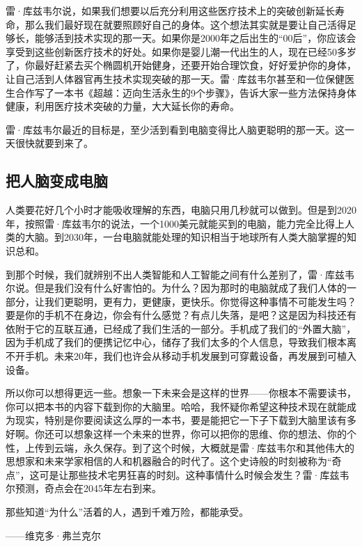 雷·库兹韦尔说，如果我们想要以后充分利用这些医疗技术上的突破创新延长寿命，那么我们最好现在就要照顾好自己的身体。这个想法其实就是要让自己活得足够长，能够活到技术实现的那一天。如果你是2000年之后出生的“00后”，你应该会享受到这些创新医疗技术的好处。如果你是婴儿潮一代出生的人，现在已经50多岁了，你最好赶紧去买个椭圆机开始健身，还要开始合理饮食，好好爱护你的身体，让自己活到人体器官再生技术实现突破的那一天。雷·库兹韦尔甚至和一位保健医生合作写了一本书《超越：迈向生活永生的9个步骤》，告诉大家一些方法保持身体健康，利用医疗技术突破的力量，大大延长你的寿命。

雷·库兹韦尔最近的目标是，至少活到看到电脑变得比人脑更聪明的那一天。这一天很快就要到来了。

\subsection{把人脑变成电脑}

人类要花好几个小时才能吸收理解的东西，电脑只用几秒就可以做到。但是到2020年，按照雷·库兹韦尔的说法，一个1000美元就能买到的电脑，能力完全比得上人类的大脑。到2030年，一台电脑就能处理的知识相当于地球所有人类大脑掌握的知识总和。

到那个时候，我们就辨别不出人类智能和人工智能之间有什么差别了，雷·库兹韦尔说。但是我们没有什么好害怕的。为什么？因为那时的电脑就成了我们人体的一部分，让我们更聪明，更有力，更健康，更快乐。你觉得这种事情不可能发生吗？要是你的手机不在身边，你会有什么感觉？有点儿失落，是吧？这是因为科技还有依附于它的互联互通，已经成了我们生活的一部分。手机成了我们的“外置大脑”，因为手机成了我们的便携记忆中心，储存了我们太多的个人信息，导致我们根本离不开手机。未来20年，我们也许会从移动手机发展到可穿戴设备，再发展到可植入设备。

所以你可以想得更远一些。想象一下未来会是这样的世界——你根本不需要读书，你可以把本书的内容下载到你的大脑里。哈哈，我怀疑你希望这种技术现在就能成为现实，特别是你要阅读这么厚的一本书，要是能把它一下子下载到大脑里该有多好啊。你还可以想象这样一个未来的世界，你可以把你的思维、你的想法、你的个性，上传到云端，永久保存。到了这个时候，大概就是雷·库兹韦尔和其他伟大的思想家和未来学家相信的人和机器融合的时代了。这个史诗般的时刻被称为“奇点”，这可是让那些技术宅男狂喜的时刻。这种事情什么时候会发生？雷·库兹韦尔预测，奇点会在2045年左右到来。

\begin{BookQuote}
那些知道“为什么”活着的人，遇到千难万险，都能承受。

\hfill ——维克多·弗兰克尔
\end{BookQuote}

